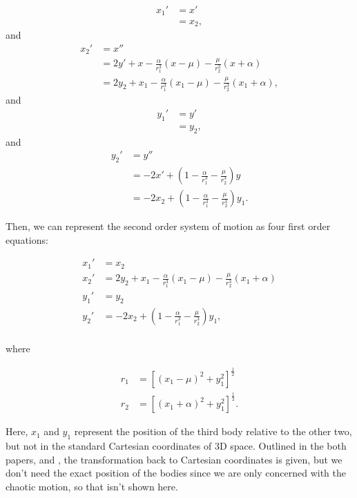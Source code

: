 \documentclass{article}
\begin{document}
\begin{align*}
    x_1' &= x' \\
    &= x_2,
\end{align*}
and
\begin{align*}
    x_2' &= x'' \\
    &= 2 y' + x
        - \frac{\alpha}{r_1^3} (x - \mu)
        - \frac{\mu}{r_2^3} (x + \alpha) \\
    &= 2 y_2 + x_1 - \frac{\alpha}{r_1^3} (x_1 - \mu)
        - \frac{\mu}{r_2^3} (x_1 + \alpha),
\end{align*}
and
\begin{align*}
    y_1' &= y' \\
    &= y_2,
\end{align*}
and
\begin{align*}
    y_2' &= y'' \\
    &= - 2 x' + \left(
        1 - \frac{\alpha}{r_1^3}
        - \frac{\mu}{r_2^3}
    \right) y \\
    &= - 2 x_2 + \left(
        1 - \frac{\alpha}{r_1^3}
        - \frac{\mu}{r_2^3}
    \right) y_1.
\end{align*}

Then, we can represent the second order system of motion as four first order
equations:

\begin{align}
    x_1' &= x_2 \nonumber \\
    x_2' &= 2 y_2 + x_1 - \frac{\alpha}{r_1^3} (x_1 - \mu)
        - \frac{\mu}{r_2^3} (x_1 + \alpha) \nonumber \\
    y_1' &= y_2 \nonumber \\
    y_2' &= - 2 x_2 + \left(
        1 - \frac{\alpha}{r_1^3}
        - \frac{\mu}{r_2^3}
    \right) y_1, \label{eq:reduce_3_body_prog_sys} \\
\end{align}

where 

\begin{align}
    r_1 &= \left[(x_1 - \mu)^2 + y_1^2\right]^{\frac{1}{2}} \nonumber \\
    r_2 &= \left[(x_1 + \alpha)^2 + y_1^2\right]^{\frac{1}{2}}.
\end{align}

Here, $x_1$ and $y_1$ represent the position of the third body relative to
the other two, but not in the standard Cartesian coordinates of 3D space.
Outlined in the both papers, \cite{eberle2007case} and \cite{frnkacase}, the transformation back to
Cartesian coordinates is given, but we don't need the exact position of the
bodies since we are only concerned with the chaotic motion, so that isn't
shown here.
\end{document}

